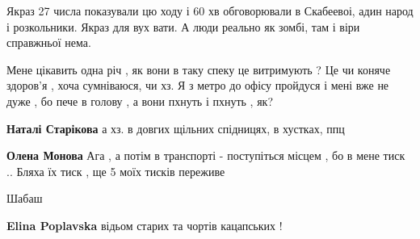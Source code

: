 \begin{itemize}
Якраз 27 числа показували цю ходу і 60 хв обговорювали в Скабеевоі, адин народ і
розкольники. Якраз для вух вати. А люди реально як зомбі, там і віри справжньої
нема.


 

Мене цікавить одна річ , як вони в таку спеку це витримують ? Це чи коняче
здоров'я , хоча сумніваюся, чи хз. Я з метро до офісу пройдуся і мені вже не
дуже , бо пече в голову , а вони пхнуть і пхнуть , як?

\begin{itemize}
 
\textbf{Наталі Старікова} а хз. в довгих щільних спідницях, в хустках, ппц

 
\textbf{Олена Монова} Ага , а потім в транспорті - поступіться місцем , бо в мене тиск ..
Бляха їх тиск , ще 5 моїх тисків переживе
\end{itemize}

 
Шабаш

\begin{itemize}
 
\textbf{Elina Poplavska} відьом старих та чортів кацапських !

 

\end{itemize}
\end{itemize}
